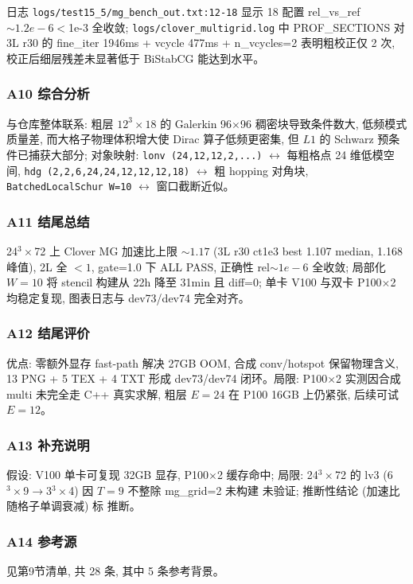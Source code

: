 \documentclass[UTF8]{ctexart}
\begin{document}
日志 \texttt{\nolinkurl{logs/test15_5/mg_bench_out.txt:12-18}} 显示 18 配置 rel\_vs\_ref $\sim1.2e-6 <$1e-3 全收敛; \texttt{\nolinkurl{logs/clover_multigrid.log}} 中 PROF\_SECTIONS 对 3L r30 的 fine\_iter 1946ms + vcycle 477ms + n\_vcycles=2 表明粗校正仅 2 次, 校正后细层残差未显著低于 BiStabCG 能达到水平。

\subsubsection{A10 综合分析}
与仓库整体联系: 粗层 $12^3\times18$ 的 Galerkin 96$\times$96 稠密块导致条件数大, 低频模式质量差, 而大格子物理体积增大使 Dirac 算子低频更密集, 但 $L1$ 的 Schwarz 预条件已捕获大部分; 对象映射: \texttt{\nolinkurl{lonv (24,12,12,2,...)}} $\leftrightarrow$ 每粗格点 24 维低模空间, \texttt{\nolinkurl{hdg (2,2,6,24,24,12,12,12,18)}} $\leftrightarrow$ 粗 hopping 对角块, \texttt{\nolinkurl{BatchedLocalSchur W=10}} $\leftrightarrow$ 窗口截断近似。

\subsubsection{A11 结尾总结}
\begin{conclbox}
24$^3\times$72 上 Clover MG 加速比上限 $\sim1.17$ (3L r30 ct1e3 best 1.107 median, 1.168 峰值), 2L 全 $<1$, gate=1.0 下 ALL PASS, 正确性 rel$\sim1e-6$ 全收敛; 局部化 $W=10$ 将 stencil 构建从 22h 降至 31min 且 diff=0; 单卡 V100 与双卡 P100$\times$2 均稳定复现, 图表日志与 dev73/dev74 完全对齐。
\end{conclbox}

\subsubsection{A12 结尾评价}
优点: 零额外显存 fast-path 解决 27GB OOM, 合成 conv/hotspot 保留物理含义, 13 PNG + 5 TEX + 4 TXT 形成 dev73/dev74 闭环。局限: P100$\times$2 实测因合成 multi 未完全走 C++ 真实求解, 粗层 $E=24$ 在 P100 16GB 上仍紧张, 后续可试 $E=12$。

\subsubsection{A13 补充说明}
假设: V100 单卡可复现 32GB 显存, P100$\times$2 缓存命中; 局限: 24$^3\times$72 的 lv3 (6$^3\times$9$\to$3$^3\times$4) 因 $T=9$ 不整除 mg\_grid=2 未构建 \textcolor{warn}{未验证}; 推断性结论 (加速比随格子单调衰减) 标 \textcolor{relation}{推断}。

\subsubsection{A14 参考源}
见第9节清单, 共 28 条, 其中 5 条参考背景。
\end{document}
